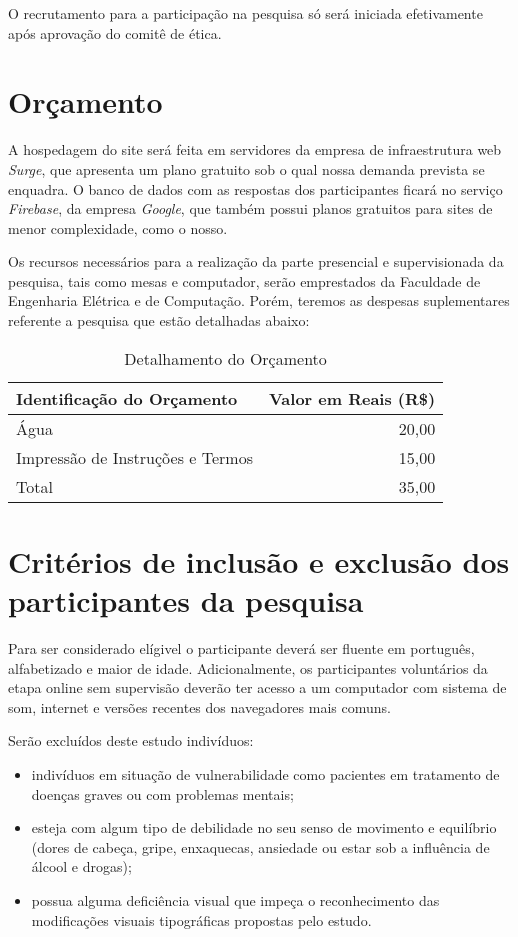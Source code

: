 \documentclass[a4paper,11pt,titlepage,singlespacing]{article}
\begin{document}
\noindent O recrutamento para a participação na pesquisa só será iniciada efetivamente após aprovação do comitê de ética.

\section{Orçamento}
\noindent A hospedagem do site será feita em servidores da empresa de infraestrutura web \textit{Surge}, que apresenta um plano gratuito sob o qual nossa demanda prevista se enquadra. O banco de dados com as respostas dos participantes ficará no serviço \textit{Firebase}, da empresa \textit{Google}, que também possui planos gratuitos para sites de menor complexidade, como o nosso.

Os recursos necessários para a realização da parte presencial e supervisionada da pesquisa, tais como mesas e computador, serão emprestados da Faculdade de Engenharia Elétrica e de Computação. Porém, teremos as despesas suplementares referente a pesquisa que estão detalhadas abaixo:

\begin{table}[h]
\caption{Detalhamento do Orçamento}
\centering
\vspace{0.5cm}
\begin{tabular}{l|r}
Identificação do Orçamento & Valor em Reais (R\$) \\
\hline 
Água        & 20,00 \\
Impressão de Instruções e Termos  & 15,00 \\
\hline 
Total & 35,00
\end{tabular}
\end{table}

\section{Critérios de inclusão e exclusão dos participantes da pesquisa}

\noindent Para ser considerado elígivel o participante deverá ser fluente em português, alfabetizado e maior de idade. Adicionalmente, os participantes voluntários da etapa online sem supervisão deverão ter acesso a um computador com sistema de som, internet e versões recentes dos navegadores mais comuns.

Serão excluídos deste estudo indivíduos:

\begin{itemize}
\item indivíduos em situação de vulnerabilidade como pacientes em tratamento de doenças graves ou com problemas mentais;
\item esteja com algum tipo de debilidade no seu senso de movimento e equilíbrio (dores de cabeça, gripe, enxaquecas, ansiedade ou estar sob a influência de álcool e drogas);
\item possua alguma deficiência visual que impeça o reconhecimento das modificações visuais tipográficas propostas pelo estudo.
\end{itemize}
\end{document}
